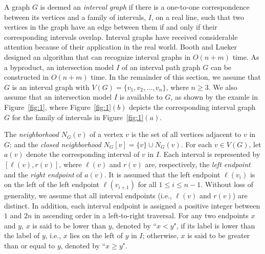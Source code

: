 \documentclass[12pt]{article}
\newcommand{\setof}[1]{\{{#1}\}}
\begin{document}
A graph $G$ is deemed an {\em interval graph} if there is a
one-to-one correspondence between its vertices and a family of
intervals, $I$, on a real line, such that two vertices in the
graph have an edge between them if and only if their corresponding
intervals overlap. Interval graphs have received considerable
attention because of their application in the real world. Booth
and Lueker~\cite{Booth76} designed an algorithm that can recognize
interval graphs in $O(n + m)$ time. As a byproduct, an
intersection model $I$ of an interval path graph $G$ can be
constructed in $O(n + m)$ time. In the remainder of this section,
we assume that $G$ is an interval graph with $V(G)=\setof{v_1,
v_2, \ldots, v_n}$, where $n\ge 3$. We also assume that an
intersection model $I$ is available to $G$, as shown by the examle
in Figure~\ref{fig:1}, where Figure~\ref{fig:1}$(b)$ depicts the
corresponding interval graph $G$ for the family of intervals in
Figure~\ref{fig:1}$(a)$.

The {\em neighborhood} $N_G(v)$ of a vertex $v$ is the set of all
vertices adjacent to $v$ in $G$; and the {\em closed neighborhood}
$N_G[v] = \{v\} \cup N_G(v)$. For each $v\in V(G)$, let $a(v)$
denote the corresponding interval of $v$ in $I$. Each interval is
represented by $[\ell(v), r(v)]$, where $\ell(v)$ and $r(v)$ are,
respectively, the {\em left endpoint} and the {\em right endpoint}
of $a(v)$. It is assumed that the left endpoint $\ell(v_i)$ is on
the left of the left endpoint $\ell(v_{i+1})$ for all $ 1 \le i
\le n -1$. Without loss of generality, we assume that all interval
endpoints (i.e., $\ell(v)$ and $r(v)$) are distinct. In addition,
each interval endpoint is assigned a positive integer between $1$
and $2n$ in ascending order in a left-to-right traversal. For any
two endpoints $x$ and $y$, $x$ is said to be lower than $y$,
denoted by ``$x < y$", if its label is lower than the label of
$y$, i.e., $x$ lies on the left of $y$ in $I$; otherwise, $x$ is
said to be greater than or equal to $y$, denoted by ``$x \ge y$".
\end{document}
